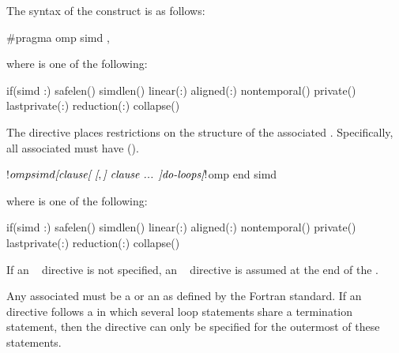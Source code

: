 \syntax
The syntax of the  construct is as follows:

\begin{ccppspecific}
\begin{ompcPragma}
#pragma omp simd \plc{[clause[ [},\plc{] clause] ... ] new-line}
\end{ompcPragma}

where  is one of the following:

\begin{indentedcodelist}
if(\plc{[}simd :\plc{] scalar-expression})
safelen()
simdlen()
linear(\plc{list[ }:\plc{ linear-step]})
aligned(\plc{list[ }:\plc{ alignment]})
nontemporal()
private()
lastprivate(\plc{[ lastprivate-modifier}:\plc{] list})
reduction(:)
collapse()
\end{indentedcodelist}

The  directive places restrictions on the structure of the associated .
Specifically, all associated  must have 
().
\end{ccppspecific}

\begin{fortranspecific}
\begin{ompfPragma}
!$omp simd \plc{[clause[ [},\plc{] clause ... ]}
   \plc{do-loops}
\plc{[}!$omp end simd\plc{]}
\end{ompfPragma}

where  is one of the following:

\begin{indentedcodelist}
if(\plc{[}simd :\plc{] scalar-logical-expression})
safelen()
simdlen()
linear(\plc{list[ }:\plc{ linear-step]})
aligned(\plc{list[ }:\plc{ alignment]})
nontemporal()
private()
lastprivate(\plc{[ lastprivate-modifier}:\plc{] list})
reduction(:)
collapse()
\end{indentedcodelist}

If an ~ directive is not specified, an ~ directive is assumed at the end
of the .

Any associated  must be a  or an
 as defined by the Fortran standard. If an
~ directive follows a  in which
several loop statements share a  termination statement, then the
directive can only be specified for the outermost of these
 statements.
\end{fortranspecific}

